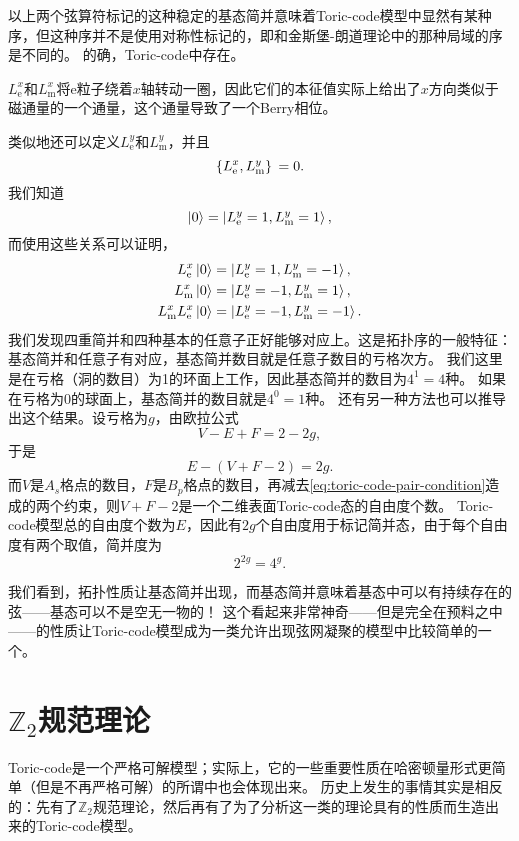 以上两个弦算符标记的这种稳定的基态简并意味着Toric-code模型中显然有某种序，但这种序并不是使用对称性标记的，即和金斯堡-朗道理论中的那种局域的序是不同的。
的确，Toric-code中存在。

${L}^x_\text{e}$和${L}^x_\text{m}$将e粒子绕着$x$轴转动一圈，因此它们的本征值实际上给出了$x$方向类似于磁通量的一个通量，这个通量导致了一个Berry相位。

类似地还可以定义${L}^y_\text{e}$和${L}^y_\text{m}$，并且
\begin{equation}
    \acomm*{{L}^x_\text{e}}{{L}^y_\text{m}} = 0.
\end{equation}
我们知道
\begin{equation}
    \ket{0} = \ket{L_\text{e}^y=1, L_\text{m}^y=1},
\end{equation}
而使用这些关系可以证明，
\begin{equation}
    \begin{aligned}
        {L}^x_\text{e} \ket{0} &= \ket{L_\text{e}^y=1, L_\text{m}^y=-1}, \\
        {L}^x_\text{m} \ket{0} &= \ket{L_\text{e}^y=-1, L_\text{m}^y=1}, \\
        {L}^x_\text{m} {L}^x_\text{e} \ket{0} &= \ket{L_\text{e}^y=-1, L_\text{m}^y=-1}.
    \end{aligned}
\end{equation}
我们发现四重简并和四种基本的任意子正好能够对应上。这是拓扑序的一般特征：基态简并和任意子有对应，基态简并数目就是任意子数目的亏格次方。
我们这里是在亏格（洞的数目）为1的环面上工作，因此基态简并的数目为$4^1=4$种。
如果在亏格为0的球面上，基态简并的数目就是$4^0=1$种。
还有另一种方法也可以推导出这个结果。设亏格为$g$，由欧拉公式
\[
    V - E + F = 2 - 2g,
\]
于是
\[
    E - (V + F - 2) = 2g.
\]
而$V$是$A_s$格点的数目，$F$是$B_p$格点的数目，再减去\eqref{eq:toric-code-pair-condition}造成的两个约束，则$V+F-2$是一个二维表面Toric-code态的自由度个数。
Toric-code模型总的自由度个数为$E$，因此有$2g$个自由度用于标记简并态，由于每个自由度有两个取值，简并度为
\[
    2^{2g} = 4^g.
\]

我们看到，拓扑性质让基态简并出现，而基态简并意味着基态中可以有持续存在的弦——基态可以不是空无一物的！
这个看起来非常神奇——但是完全在预料之中——的性质让Toric-code模型成为一类允许出现弦网凝聚的模型中比较简单的一个。

\section{$\mathbb{Z}_2$规范理论}

Toric-code是一个严格可解模型；实际上，它的一些重要性质在哈密顿量形式更简单（但是不再严格可解）的所谓中也会体现出来。
历史上发生的事情其实是相反的：先有了$\mathbb{Z}_2$规范理论，然后再有了为了分析这一类的理论具有的性质而生造出来的Toric-code模型。

